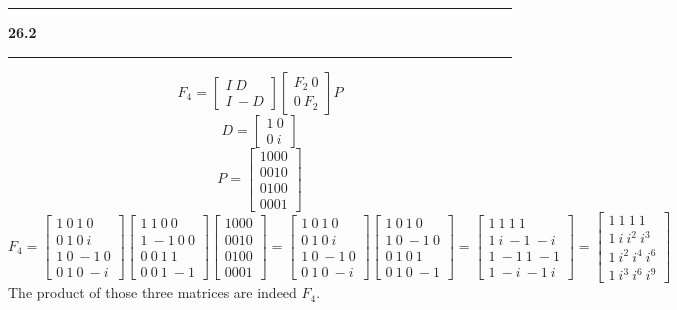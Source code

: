 \documentclass[11pt]{article}
\newcommand\question[2]{\vspace{.25in}\hrule\textbf{#1 #2}\vspace{.5em}\hrule\vspace{.10in}}
\begin{document}
\question{26.2}{}
$$F_4 = \begin{bmatrix} I \ D \\ I \ -D \end{bmatrix}\begin{bmatrix} F_2 \ 0 \\ 0 \ F_2 \end{bmatrix}P$$
$$D = \begin{bmatrix} 1 \ 0 \\ 0 \ i \end{bmatrix}$$
$$P = \begin{bmatrix} 1 0 0 0 \\ 0 0 1 0 \\ 0 1 0 0 \\ 0 0 0 1 \end{bmatrix}$$
$$F_4 = \begin{bmatrix} 1 \ 0 \ 1 \ 0 \\ 0 \ 1 \ 0 \ i \\ 1 \ 0 \ -1 \ 0 \\ 0 \ 1 \ 0 \ -i \end{bmatrix}\begin{bmatrix} 1 \ 1 \ 0 \ 0 \\ 1 \ -1 \ 0 \ 0 \\ 0 \ 0 \ 1 \ 1 \\ 0 \ 0 \ 1 \ -1 \end{bmatrix}\begin{bmatrix} 1 0 0 0 \\ 0 0 1 0 \\ 0 1 0 0 \\ 0 0 0 1 \end{bmatrix} = \begin{bmatrix} 1 \ 0 \ 1 \ 0 \\ 0 \ 1 \ 0 \ i \\ 1 \ 0 \ -1 \ 0 \\ 0 \ 1 \ 0 \ -i \end{bmatrix}\begin{bmatrix} 1 \ 0 \ 1 \ 0 \\ 1 \ 0 \ -1 \ 0 \\ 0 \ 1 \ 0 \ 1 \\ 0 \ 1 \ 0 \ -1 \end{bmatrix} = \begin{bmatrix} 1 \ 1 \ 1 \ 1 \\ 1 \ i \ -1 \ -i \\ 1 \ -1 \ 1 \ -1 \\ 1 \ -i \ -1 \ i \end{bmatrix} = \begin{bmatrix} 1 \ 1 \ 1 \ 1 \\ 1 \ i \ i^2 \ i^3 \\ 1 \ i^2 \ i^4 \ i^6 \\ 1 \ i^3 \ i^6 \ i^9 \end{bmatrix}$$
The product of those three matrices are indeed \(F_4\).
\end{document}
